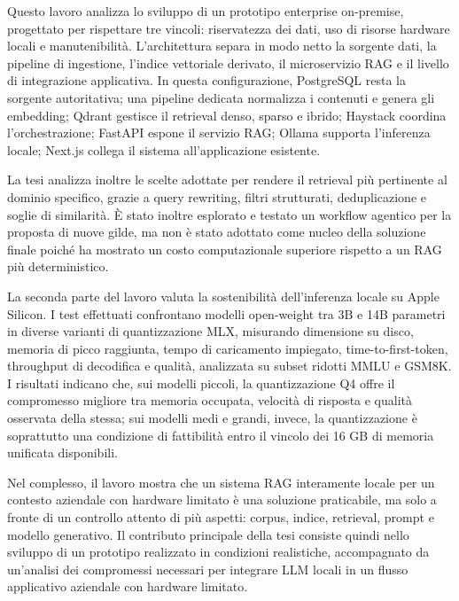 \documentclass{report}
\begin{document}
Questo lavoro analizza lo sviluppo di un prototipo enterprise on-premise, 
progettato per rispettare tre vincoli: riservatezza dei dati, 
uso di risorse hardware locali e manutenibilità. L'architettura separa 
in modo netto la sorgente dati, la pipeline di ingestione, l'indice vettoriale derivato, 
il microservizio RAG e il livello di integrazione applicativa. In questa configurazione, 
PostgreSQL resta la sorgente autoritativa; una pipeline dedicata normalizza i contenuti 
e genera gli embedding; Qdrant gestisce il retrieval denso, sparso e ibrido; Haystack 
coordina l'orchestrazione; FastAPI espone il servizio RAG; Ollama supporta l'inferenza 
locale; Next.js collega il sistema all'applicazione esistente.

La tesi analizza inoltre le scelte adottate per rendere il retrieval più
pertinente al dominio specifico, grazie a query rewriting, filtri strutturati, deduplicazione
e soglie di similarità. È stato inoltre esplorato e testato un workflow agentico
per la proposta di nuove gilde, ma non è stato adottato come nucleo della soluzione finale poiché
ha mostrato un costo computazionale superiore rispetto a un RAG più deterministico.

La seconda parte del lavoro valuta la sostenibilità dell'inferenza locale su
Apple Silicon. I test effettuati confrontano modelli open-weight tra 3B e 14B
parametri in diverse varianti di quantizzazione MLX, misurando dimensione su
disco, memoria di picco raggiunta, tempo di caricamento impiegato, time-to-first-token, throughput
di decodifica e qualità, analizzata su subset ridotti MMLU e GSM8K. I risultati indicano
che, sui modelli piccoli, la quantizzazione Q4 offre il compromesso migliore
tra memoria occupata, velocità di risposta e qualità osservata della stessa; sui modelli medi e
grandi, invece, la quantizzazione è soprattutto una condizione di fattibilità
entro il vincolo dei 16 GB di memoria unificata disponibili.

Nel complesso, il lavoro mostra che un sistema RAG interamente locale per un contesto aziendale 
con hardware limitato è una soluzione praticabile, ma solo a fronte di un controllo attento di più aspetti: 
corpus, indice, retrieval, prompt e modello generativo. 
Il contributo principale della tesi consiste quindi nello sviluppo di un prototipo 
realizzato in condizioni realistiche, accompagnato da un'analisi dei compromessi 
necessari per integrare LLM locali in un flusso applicativo aziendale con hardware limitato.
\clearpage


\tableofcontents
\pagestyle{mystyle}
\end{document}
